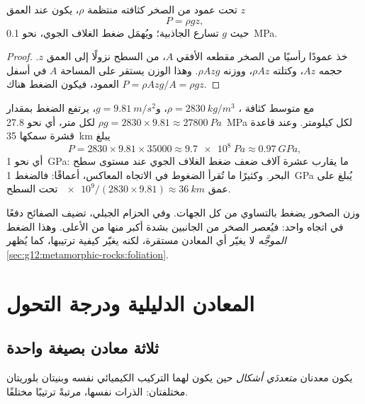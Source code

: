 \begin{proposition}\label{prop:g12:metamorphic-rocks:lithostatic}
تحت عمود من الصخر كثافته منتظمة $\rho$، يكون 
عند العمق $z$
\[
  P = \rho g z ,
\]
حيث $g$ تسارع الجاذبية؛ ويُهمَل ضغط
الغلاف الجوي، نحو \qty{0.1}{MPa}.
\end{proposition}

\begin{proof}
خذ عمودًا رأسيًا من الصخر مقطعه الأفقي $A$، من
السطح نزولًا إلى العمق $z$. حجمه $Az$، وكتلته $\rho A z$،
ووزنه $\rho A z g$. وهذا الوزن يستقر على المساحة $A$ في أسفل
العمود، فيكون الضغط هناك $P = \rho A z g / A = \rho g z$.
\end{proof}

مع متوسط كثافة ، $\rho = \qty{2830}{kg/m^3}$،
و$g = \qty{9.81}{m/s^2}$، يرتفع الضغط بمقدار $\rho g = 2830 \times 9.81
\approx \qty{27800}{Pa}$ لكل متر، أي نحو \qty{27.8}{MPa} لكل
كيلومتر. وعند قاعدة قشرة سمكها \qty{35}{km} يبلغ
\[
  P = 2830 \times 9.81 \times \num{35000} \approx \qty{9.7e8}{Pa} \approx
  \qty{0.97}{GPa},
\]
أي نحو \qty{1}{GPa}: ما يقارب عشرة آلاف ضعف ضغط الغلاف الجوي
عند مستوى سطح البحر. وكثيرًا ما تُقرأ الضغوط في الاتجاه المعاكس، أعماقًا:
فالضغط \qty{1}{GPa} يُبلغ على عمق $\num{e9}/(2830 \times 9.81) \approx \qty{36}{km}$
تحت السطح.

وزن الصخور يضغط بالتساوي من كل الجهات. وفي الحزام الجبلي،
تضيف الصفائح دفعًا في اتجاه واحد: فيُعصر الصخر من
الجانبين بشدة أكبر منها من الأعلى. وهذا الضغط \emph{الموجَّه} لا يغيّر أي
المعادن مستقرة، لكنه يغيّر كيفية ترتيبها، كما
يُظهر \cref{sec:g12:metamorphic-rocks:foliation}.

\section{المعادن الدليلية ودرجة التحول}

\subsection{ثلاثة معادن بصيغة واحدة}

\begin{definition}\label{def:g12:metamorphic-rocks:polymorph}
يكون معدنان \emph{متعددَي أشكال} حين يكون لهما
التركيب الكيميائي نفسه وبنيتان بلوريتان مختلفتان: الذرات نفسها،
مرتبةً ترتيبًا مختلفًا.
\end{definition}

